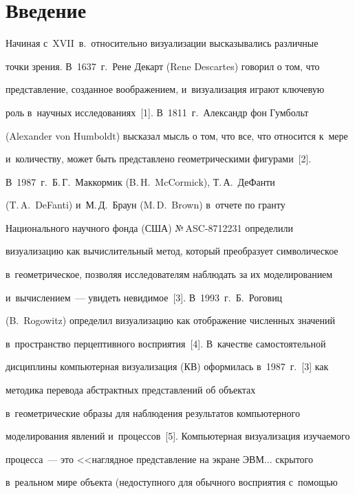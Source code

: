 \section{Введение}



\vspace*{-4pt}



  Начиная с~XVII~в.\ относительно визуализации высказывались различные 

точки зрения. В~1637~г.\ Рене Декарт (Rene Descartes) говорил о том, что 

представление, созданное воображением, и~визуализация играют ключевую 

роль в~научных исследованиях~[1]. В~1811~г.\ Александр фон Гумбольт 

(Alexander von Humboldt) высказал мысль о том, что все, что относится к~мере 

и~количеству, может быть представлено геометрическими фигурами~[2]. 

В~1987~г.\ Б.\,Г.~Маккормик (B.\,H.~McCormick), Т.\,А.~ДеФанти 

(T.\,A.~DeFanti) и~М.\,Д.~Браун (M.\,D.~Brown) в~отчете по гранту 

Национального научного фонда (США) №\,ASC-8712231 определили 

визуализацию как вычислительный метод, который преобразует символическое 

в~геометрическое, позволяя исследователям наблюдать за их моделированием 

и~вычислением~--- увидеть невидимое~[3]. В~1993~г.\ Б.~Роговиц 

(B.~Rogowitz) определил визуализацию как отображение численных значений 

в~пространство перцептивного восприятия~[4]. В~качестве самостоятельной 

дисциплины компьютерная визуализация (КВ) оформилась в~1987~г.~[3] как 

методика перевода абстрактных представлений об объектах 

в~геометрические образы для наблюдения результатов компьютерного 

моделирования явлений и~процессов~[5]. Компьютерная визуализация изучаемого 

процесса~--- это <<наглядное пред\-став\-ле\-ние на экране ЭВМ$\ldots$ скрытого 

в~реальном мире объекта (недоступного для обычного восприятия с~по\-мощью 

